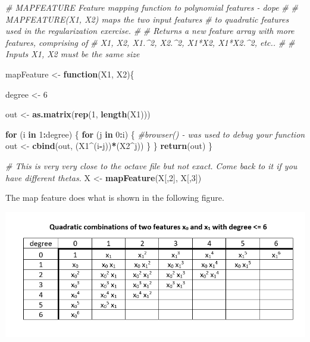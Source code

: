 \documentclass[
]{book}
\newenvironment{Shaded}{\begin{snugshade}}{\end{snugshade}}
\newcommand{\CommentTok}[1]{\textcolor[rgb]{0.56,0.35,0.01}{\textit{#1}}}
\newcommand{\ControlFlowTok}[1]{\textcolor[rgb]{0.13,0.29,0.53}{\textbf{#1}}}
\newcommand{\DecValTok}[1]{\textcolor[rgb]{0.00,0.00,0.81}{#1}}
\newcommand{\KeywordTok}[1]{\textcolor[rgb]{0.13,0.29,0.53}{\textbf{#1}}}
\newcommand{\NormalTok}[1]{#1}
\newcommand{\OperatorTok}[1]{\textcolor[rgb]{0.81,0.36,0.00}{\textbf{#1}}}
\newcommand{\StringTok}[1]{\textcolor[rgb]{0.31,0.60,0.02}{#1}}
\begin{document}
\begin{Shaded}
\begin{Highlighting}[]
\CommentTok{#  MAPFEATURE Feature mapping function to polynomial features - dope}
\CommentTok{# }
\CommentTok{#    MAPFEATURE(X1, X2) maps the two input features}
\CommentTok{#    to quadratic features used in the regularization exercise.}
\CommentTok{# }
\CommentTok{#    Returns a new feature array with more features, comprising of }
\CommentTok{#    X1, X2, X1.^2, X2.^2, X1*X2, X1*X2.^2, etc..}
\CommentTok{# }
\CommentTok{#    Inputs X1, X2 must be the same size}

\NormalTok{mapFeature <-}\StringTok{ }\ControlFlowTok{function}\NormalTok{(X1, X2)\{}
        
\NormalTok{        degree <-}\StringTok{ }\DecValTok{6}
        
\NormalTok{        out <-}\StringTok{ }\KeywordTok{as.matrix}\NormalTok{(}\KeywordTok{rep}\NormalTok{(}\DecValTok{1}\NormalTok{, }\KeywordTok{length}\NormalTok{(X1)))}
        
        \ControlFlowTok{for}\NormalTok{ (i }\ControlFlowTok{in} \DecValTok{1}\OperatorTok{:}\NormalTok{degree) \{}
                \ControlFlowTok{for}\NormalTok{ (j }\ControlFlowTok{in} \DecValTok{0}\OperatorTok{:}\NormalTok{i) \{}
                        \CommentTok{#browser() - was used to debug your function}
\NormalTok{                        out <-}\StringTok{ }\KeywordTok{cbind}\NormalTok{(out, (X1}\OperatorTok{^}\NormalTok{(i}\OperatorTok{-}\NormalTok{j))}\OperatorTok{*}\NormalTok{(X2}\OperatorTok{^}\NormalTok{j))}
\NormalTok{                \}}
\NormalTok{        \}}
        \KeywordTok{return}\NormalTok{(out)  }
\NormalTok{\}}

\CommentTok{# This is very very close to the octave file but not exact. Come back to it if you have different thetas.}
\NormalTok{X <-}\StringTok{ }\KeywordTok{mapFeature}\NormalTok{(X[,}\DecValTok{2}\NormalTok{], X[,}\DecValTok{3}\NormalTok{])}
\end{Highlighting}
\end{Shaded}

The map feature does what is shown in the following figure.

\includegraphics{mapFeature.png}
\end{document}

